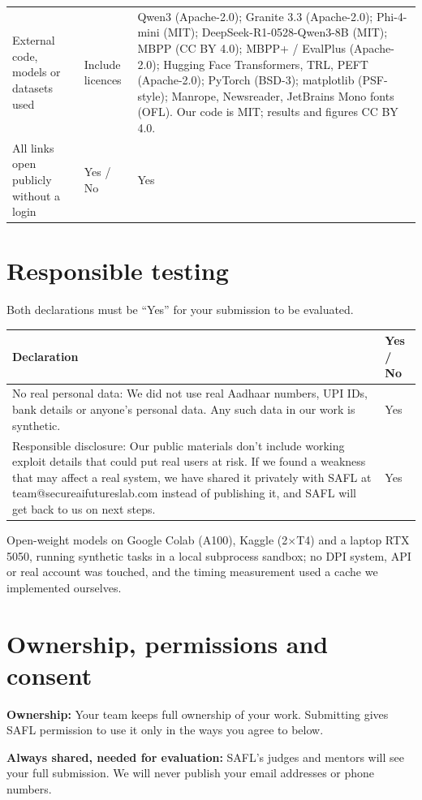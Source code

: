 {\begin{xltabular}{\textwidth}{@{}L{0.15\textwidth} L{0.28\textwidth} Y@{}}
External code, models or datasets used & Include licences & Qwen3 (Apache-2.0); Granite 3.3 (Apache-2.0); Phi-4-mini (MIT); DeepSeek-R1-0528-Qwen3-8B (MIT); MBPP (CC BY 4.0); MBPP+ / EvalPlus (Apache-2.0); Hugging Face Transformers, TRL, PEFT (Apache-2.0); PyTorch (BSD-3); matplotlib (PSF-style); Manrope, Newsreader, JetBrains Mono fonts (OFL). Our code is MIT; results and figures CC BY 4.0. \\
All links open publicly without a login & Yes / No & Yes \\
\bottomrule
\end{xltabular}}

\section{Responsible testing}
Both declarations must be ``Yes'' for your submission to be evaluated.

\noindent\begin{tabularx}{\textwidth}{@{}Y L{0.12\textwidth}@{}}
\toprule
\textbf{Declaration} & \textbf{Yes / No} \\
\midrule
No real personal data: We did not use real Aadhaar numbers, UPI IDs, bank details or anyone's personal data. Any such data in our work is synthetic. & Yes \\
Responsible disclosure: Our public materials don't include working exploit details that could put real users at risk. If we found a weakness that may affect a real system, we have shared it privately with SAFL at team@secureaifutureslab.com instead of publishing it, and SAFL will get back to us on next steps. & Yes \\
\bottomrule
\end{tabularx}

Open-weight models on Google Colab (A100), Kaggle (2$\times$T4) and a laptop RTX 5050, running synthetic tasks in a local subprocess sandbox; no DPI system, API or real account was touched, and the timing measurement used a cache we implemented ourselves.

\section{Ownership, permissions and consent}
\textbf{Ownership:} Your team keeps full ownership of your work. Submitting gives SAFL permission to use it only in the ways you agree to below.

\textbf{Always shared, needed for evaluation:} SAFL's judges and mentors will see your full submission. We will never publish your email addresses or phone numbers.

